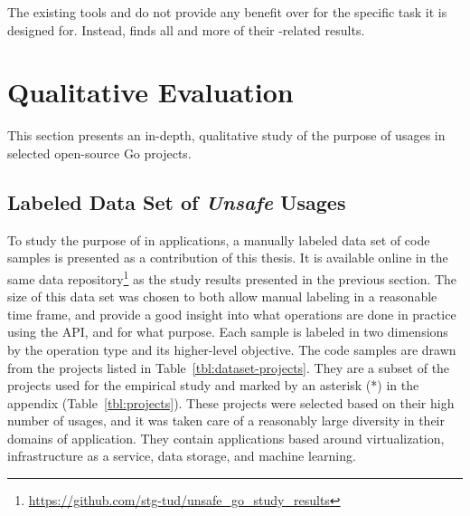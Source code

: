 \begin{answerToRQ}[\ref{rq:linterComparison}]
    The existing tools \toolVet{} and \toolGosec{} do not provide any benefit over \toolGeiger{} for the specific task
    it is designed for.
    Instead, \toolGeiger{} finds all and more of their \unsafe{}-related results.
\end{answerToRQ}



\section{Qualitative Evaluation}\label{sec:go-geiger:qualitative-evaluation}

This section presents an in-depth, qualitative study of the purpose of \unsafe{} usages in
\projsForLabeledCodeSnippets{} selected open-source Go projects.



\subsection{Labeled Data Set of \textit{Unsafe} Usages}\label{subsec:go-geiger:qualitative-evaluation:labeled-dataset}

To study the purpose of \unsafe{} in applications, a manually labeled data set of \numberLabeledCodeSnippets{} code
samples is presented as a contribution of this thesis.
It is available online in the same data repository\footnote{\url{https://github.com/stg-tud/unsafe_go_study_results}} as
the study results presented in the previous section.
The size of this data set was chosen to both allow manual labeling in a reasonable time frame, and provide a good
insight into what operations are done in practice using the \unsafe{} \acrshort{API}, and for what purpose.
Each sample is labeled in two dimensions by the operation type and its higher-level objective.
The \numberLabeledCodeSnippets{} code samples are drawn from the projects listed in Table~\ref{tbl:dataset-projects}.
They are a subset of the projects used for the empirical study and marked by an asterisk (*) in the appendix
(Table~\ref{tbl:projects}).
These projects were selected based on their high number of \unsafe{} usages, and it was taken care of a reasonably large
diversity in their domains of application.
They contain applications based around virtualization, infrastructure as a service, data storage, and machine learning.


